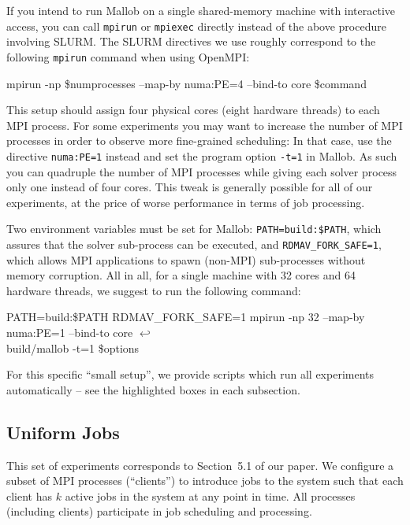 \documentclass[runningheads]{article}
\newcommand{\CR}{{\tiny$\hookleftarrow$}}
\numberwithin{dummy}{subsection}
\begin{document}
If you intend to run Mallob on a single shared-memory machine with interactive access, you can call \texttt{mpirun} or \texttt{mpiexec} directly instead of the above procedure involving SLURM.
The SLURM directives we use roughly correspond to the following \texttt{mpirun} command when using OpenMPI:

\begin{ttfenv}
 mpirun -np \$numprocesses --map-by numa:PE=4 --bind-to core \$command
\end{ttfenv}

This setup should assign four physical cores (eight hardware threads) to each MPI process.
For some experiments you may want to increase the number of MPI processes in order to observe more fine-grained scheduling: In that case, use the directive \texttt{numa:PE=1} instead and set the program option \texttt{-t=1} in Mallob.
As such you can quadruple the number of MPI processes while giving each solver process only one instead of four cores.
This tweak is generally possible for all of our experiments, at the price of worse performance in terms of job processing.

Two environment variables must be set for Mallob: \texttt{PATH=build:\$PATH}, which assures that the solver sub-process can be executed, and \texttt{RDMAV\_FORK\_SAFE=1}, which allows MPI applications to spawn (non-MPI) sub-processes without memory corruption.
All in all, for a single machine with 32 cores and 64 hardware threads, we suggest to run the following command:

\begin{ttfenv}
PATH=build:\$PATH RDMAV\_FORK\_SAFE=1 mpirun -np 32 --map-by numa:PE=1 --bind-to core \CR\\
build/mallob -t=1 \$options
\end{ttfenv}

For this specific ``small setup'', we provide scripts which run all experiments automatically -- see the highlighted boxes in each subsection.









\subsection{Uniform Jobs}
\label{sec:uniform-jobs}

This set of experiments corresponds to Section~5.1 of our paper.
We configure a subset of MPI processes (``clients'') to introduce jobs to the system such that each client has $k$ active jobs in the system at any point in time.
All processes (including clients) participate in job scheduling and processing.
\end{document}
